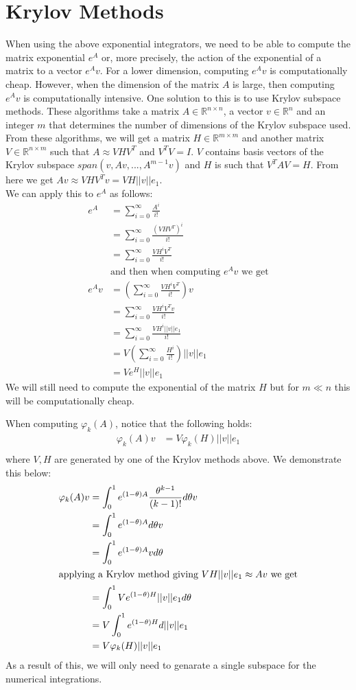 \section{Krylov Methods}
When using the above exponential integrators, we need to be able to compute the matrix exponential $e^{A}$ or, more precisely, the action of the exponential of a matrix to a vector $e^{A}v$.
For a lower dimension, computing $e^{A}v$ is computationally cheap.
However, when the dimension of the matrix $A$ is large, then computing $e^{A}v$ is computationally intensive.
One solution to this is to use Krylov subspace methods.
These algorithms take a matrix $A\in \mathbb{R}^{n\times n}$, a vector $v \in \mathbb{R}^n$ and an integer $m$ that determines the number of dimensions of the Krylov subspace used.
From these algorithms, we will get a matrix $H \in \mathbb{R}^{m\times m}$ and another matrix $V \in \mathbb{R}^{n\times m}$ such that $A \approx VHV^T$ and $V^TV = I$.
$V$ contains basis vectors of the Krylov subspace $span(v, Av, ..., A^{m-1}v)$ and $H$ is such that $V^TAV = H$.
From here we get $Av \approx VHV^Tv = VH||v||e_1$.\\
We can apply this to $e^A$ as follows:
\begin{align*}
e^A &= \sum^{\infty}_{i=0}\frac{A^i}{i!}\\
&= \sum^{\infty}_{i=0}\frac{(VHV^T)^i}{i!} \\
&= \sum^{\infty}_{i=0}\frac{VH^iV^T}{i!} \\
&\text {and then when computing $e^Av$ we get}\\
e^Av &= (\sum^{\infty}_{i=0}\frac{VH^iV^T}{i!})v \\
&= \sum^{\infty}_{i=0}\frac{VH^iV^Tv}{i!} \\
&= \sum^{\infty}_{i=0}\frac{VH^i||v||e_1}{i!} \\
&= V(\sum^{\infty}_{i=0}\frac{H^i}{i!})||v||e_1 \\
&= Ve^H||v||e_1
\end{align*}
We will still need to compute the exponential of the matrix $H$ but for $m\ll n$ this will be computationally cheap.

When computing $\varphi_k(A)$, notice that the following holds:
\begin{align*}
    \varphi_k(A)v &= V\varphi_k(H)||v||e_1\\
\end{align*}
where $V,H$ are generated by one of the Krylov methods above. 
We demonstrate this below:
\begin{align*}
    \varphi_k(A)v &= \int^1_0e^{(1-\theta)A}\frac{\theta^{k-1}}{(k-1)!}d\theta v\\
    &= \int^1_0e^{(1-\theta) A}d\theta v\\
    &= \int^1_0e^{(1-\theta) A}vd\theta\\
\intertext{applying a Krylov method giving $VH||v||e_1 \approx Av$ we get}
    &= \int^1_0Ve^{(1-\theta) H}||v||e_1d\theta\\
    &= V\int^1_0e^{(1-\theta) H}d||v||e_1\\
    &= V\varphi_k(H)||v||e_1
\end{align*}
As a result of this, we will only need to genarate a single subspace for the numerical integrations.

